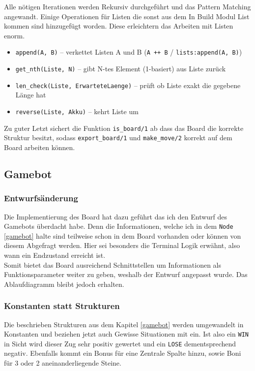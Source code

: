 Alle nötigen Iterationen werden Rekursiv durchgeführt und das Pattern Matching angewandt. Einige Operationen für Listen die sonst aus dem In Build Modul List kommen sind hinzugefügt worden. Diese erleichtern das Arbeiten mit Listen enorm.

\begin{itemize}
	\item \texttt{append(A, B)} -- verkettet Listen A und B (\texttt{A ++ B} / \texttt{lists:append(A, B)})
	\item \texttt{get\_nth(Liste, N)} -- gibt N-tes Element (1-basiert) aus Liste zur\"uck
	\item \texttt{len\_check(Liste, ErwarteteLaenge)} -- pr\"uft ob Liste exakt die gegebene L\"ange hat
	\item \texttt{reverse(Liste, Akku)} -- kehrt Liste um
\end{itemize}

Zu guter Letzt sichert die Funktion \texttt{is\_board/1} ab dass das Board die korrekte Struktur besitzt, sodass \texttt{export\_board/1} und  \texttt{make\_move/2} korrekt auf dem Board arbeiten können.

\newpage

\subsection{Gamebot}

\subsubsection{Entwurfsänderung}
Die Implementierung des Board hat dazu geführt das ich den Entwurf des Gamebots überdacht habe. Denn die Informationen, welche ich in dem \texttt{Node} \ref{gamebot} halte sind teilweise schon in dem Board vorhanden oder können von diesem Abgefragt werden. Hier sei besonders die Terminal Logik erwähnt, also wann ein Endzustand erreicht ist.
\newline \\
Somit bietet das Board ausreichend Schnittstellen um Informationen als Funktionsparameter weiter zu geben, weshalb der Entwurf angepasst wurde. Das Ablaufdiagramm bleibt jedoch erhalten.
\subsubsection{Konstanten statt Strukturen}
Die beschrieben Strukturen aus dem Kapitel \ref{gamebot} werden umgewandelt in Konstanten und beziehen jetzt auch Gewisse Situationen mit ein. Ist also ein \texttt{WIN} in Sicht wird dieser Zug sehr positiv gewertet und ein \texttt{LOSE} dementsprechend negativ. Ebenfalls kommt ein Bonus für eine Zentrale Spalte hinzu, sowie Boni für 3 oder 2 aneinanderliegende Steine.

